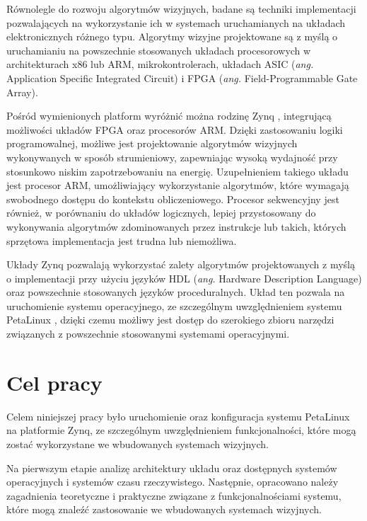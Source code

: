 Równolegle do rozwoju algorytmów wizyjnych, badane są techniki implementacji pozwalających na wykorzystanie ich w systemach uruchamianych na układach elektronicznych różnego typu. %
Algorytmy wizyjne projektowane są z myślą o uruchamianiu na powszechnie stosowanych układach procesorowych w architekturach x86 lub ARM, mikrokontrolerach, układach ASIC (\emph{ang.} Application Specific Integrated Circuit) i FPGA (\emph{ang.} Field-Programmable Gate Array). %

Pośród wymienionych platform wyróżnić można rodzinę Zynq \cite{zybo-reference-manual}, integrującą możliwości układów FPGA oraz procesorów ARM. 
Dzięki zastosowaniu logiki programowalnej, możliwe jest projektowanie algorytmów wizyjnych wykonywanych w sposób strumieniowy, zapewniając wysoką wydajność przy stosunkowo niskim zapotrzebowaniu na energię. %
Uzupełnieniem takiego układu jest procesor ARM, umożliwiający wykorzystanie algorytmów, które wymagają swobodnego dostępu do kontekstu obliczeniowego. Procesor sekwencyjny jest również, w porównaniu do układów logicznych, lepiej przystosowany do wykonywania algorytmów zdominowanych przez instrukcje lub takich, których sprzętowa implementacja jest trudna lub niemożliwa.%

Układy Zynq pozwalają wykorzystać zalety algorytmów projektowanych z myślą o implementacji przy użyciu języków HDL (\emph{ang.} Hardware Description Language) oraz powszechnie stosowanych języków proceduralnych. 
Układ ten pozwala na uruchomienie systemu operacyjnego, ze szczególnym uwzględnieniem systemu PetaLinux \cite{petalinux-tools}, dzięki czemu możliwy jest dostęp do szerokiego zbioru narzędzi związanych z powszechnie stosowanymi systemami operacyjnymi.

\section{Cel pracy}

Celem niniejszej pracy było uruchomienie oraz konfiguracja systemu PetaLinux na platformie Zynq, ze szczególnym uwzględnieniem funkcjonalności, które mogą zostać wykorzystane we wbudowanych systemach wizyjnych. %

Na pierwszym etapie analizę architektury układu oraz dostępnych systemów operacyjnych i systemów czasu rzeczywistego. %
Następnie, opracowano należy zagadnienia teoretyczne i praktyczne związane z funkcjonalnościami systemu, które mogą znaleźć zastosowanie we wbudowanych systemach wizyjnych. %

